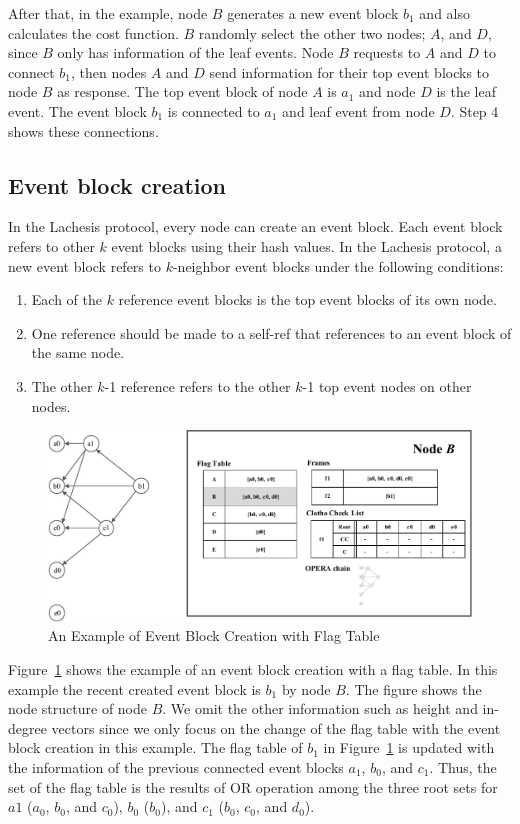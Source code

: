 \documentclass{article}
\begin{document}
After that, in the example, node $B$ generates a new event block $b_1$ and also calculates the cost function. $B$ randomly select the other two nodes; $A$, and $D$, since $B$ only has information of the leaf events. Node $B$ requests to $A$ and $D$ to connect $b_1$, then nodes $A$ and $D$ send information for their top event blocks to node $B$ as response. The top event block of node $A$ is $a_1$ and node $D$ is the leaf event. The event block $b_1$ is connected to $a_1$ and leaf event from node $D$. Step 4 shows these connections. 

\subsection{Event block creation}
In the Lachesis protocol, every node can create an event block. Each event block refers to other $k$ event blocks using their hash values. In the Lachesis protocol, a new event block refers to $k$-neighbor event blocks under the following conditions:

\begin{enumerate}
\item Each of the $k$ reference event blocks is the top event blocks of its own node.
\item One reference should be made to a self-ref that references to an event block of the same node. 
\item The other $k$-1 reference refers to the other $k$-1 top event nodes on other nodes.
\end{enumerate}

\newpage

\begin{figure}[H] \centering  
\includegraphics[width=1.0\textwidth]{Ex_eventblock.pdf}
\caption{An Example of Event Block Creation with Flag Table}
\label{fig:ex_ebc}
\end{figure}

Figure~\ref{fig:ex_ebc} shows the example of an event block creation with a flag table. In this example the recent created event block is $b_1$ by node $B$. The figure shows the node structure of node $B$. We omit the other information such as height and in-degree vectors since we only focus on the change of the flag table with the event block creation in this example. The flag table of $b_1$ in Figure~\ref{fig:ex_ebc} is updated with the information of the previous connected event blocks $a_1$, $b_0$, and $c_1$. Thus, the set of the flag table is the 
results of OR operation among the three root sets for $a1$ ($a_0$, $b_0$, and $c_0$), $b_0$ ($b_0$), and $c_1$ ($b_0$, $c_0$, and $d_0$). 
\end{document}
